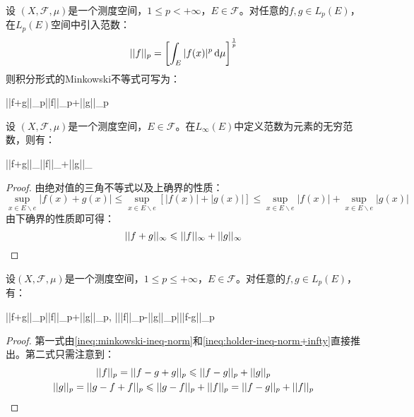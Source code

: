 \begin{theorem}
	设	$(X,\mathscr{F},\mu)$是一个测度空间，$1\leqslant p<+\infty$，$E\in\mathscr{F}$。对任意的$f,g\in L_p(E)$，在$L_p(E)$空间中引入范数：
	\begin{equation*}
		||f||_p=\left[\int_{E}^{}|f(x)|^p\mathop{}\!\mathrm{d}\mu\right]^\frac{1}{p}
	\end{equation*}
	则积分形式的Minkowski不等式可写为：
	\begin{inequality*}\label{ineq:minkowski-ineq-norm}
		||f+g||_p\leqslant||f||_p+||g||_p
	\end{inequality*}
\end{theorem}
\begin{theorem}
	设	$(X,\mathscr{F},\mu)$是一个测度空间，$E\in\mathscr{F}$。在$L_{\infty}(E)$中定义范数为元素的无穷范数，则有：
	\begin{inequality*}\label{ineq:minkowski-ineq-norm+infty}
		||f+g||_{\infty}\leqslant||f||_{\infty}+||g||_{\infty}
	\end{inequality*}
\end{theorem}
\begin{proof}
	由绝对值的三角不等式以及上确界的性质：
	\begin{equation*}
		\sup_{x\in E\backslash e}|f(x)+g(x)|\leqslant\sup_{x\in E\backslash e}[|f(x)|+|g(x)|]\leqslant\sup_{x\in E\backslash e}|f(x)|+\sup_{x\in E\backslash e}|g(x)|
	\end{equation*}
	由下确界的性质即可得：
	\begin{equation*}
		||f+g||_{\infty}\leqslant||f||_{\infty}+||g||_{\infty}\qedhere
	\end{equation*}
\end{proof}
\begin{theorem}
	设$(X,\mathscr{F},\mu)$是一个测度空间，$1\leqslant p\leqslant+\infty$，$E\in\mathscr{F}$。对任意的$f,g\in L_p(E)$，有：
	\begin{inequality*}\label{ineq:minkowski-ineq-norm-all}
		||f+g||_p\leqslant||f||_p+||g||_p,\quad
		\Big|||f||_p-||g||_p\Big|\leqslant||f-g||_p
	\end{inequality*}
\end{theorem}
\begin{proof}
	第一式由\cref{ineq:minkowski-ineq-norm}和\cref{ineq:holder-ineq-norm+infty}直接推出。第二式只需注意到：
	\begin{gather*}
		||f||_p=||f-g+g||_p\leqslant||f-g||_p+||g||_p \\
		||g||_p=||g-f+f||_p\leqslant||g-f||_p+||f||_p=||f-g||_p+||f||_p\qedhere
	\end{gather*}
\end{proof}